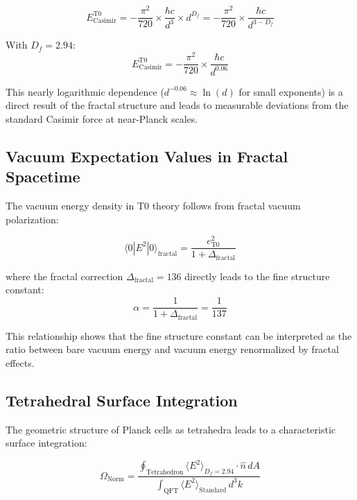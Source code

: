 \documentclass[12pt,a4paper]{article}
\theoremstyle{definition}
\begin{document}
	\begin{equation}
		E_{\text{Casimir}}^{\text{T0}} = -\frac{\pi^2}{720} \times \frac{\hbar c}{d^3} \times d^{D_f} = -\frac{\pi^2}{720} \times \frac{\hbar c}{d^{3-D_f}}
	\end{equation}
	
	With $D_f = 2.94$:
	\begin{equation}
		E_{\text{Casimir}}^{\text{T0}} = -\frac{\pi^2}{720} \times \frac{\hbar c}{d^{0.06}}
	\end{equation}
	
	This nearly logarithmic dependence ($d^{-0.06} \approx \ln(d)$ for small exponents) is a direct result of the fractal structure and leads to measurable deviations from the standard Casimir force at near-Planck scales.
	
	\subsection{Vacuum Expectation Values in Fractal Spacetime}
	
	The vacuum energy density in T0 theory follows from fractal vacuum polarization:
	
	\begin{equation}
		\langle 0|E^2|0 \rangle_{\text{fractal}} = \frac{e_{\text{T0}}^2}{1 + \Delta_{\text{fractal}}}
	\end{equation}
	
	where the fractal correction $\Delta_{\text{fractal}} = 136$ directly leads to the fine structure constant:
	\begin{equation}
		\alpha = \frac{1}{1 + \Delta_{\text{fractal}}} = \frac{1}{137}
	\end{equation}
	
	This relationship shows that the fine structure constant can be interpreted as the ratio between bare vacuum energy and vacuum energy renormalized by fractal effects.
	
	\subsection{Tetrahedral Surface Integration}
	
	The geometric structure of Planck cells as tetrahedra leads to a characteristic surface integration:
	
	\begin{equation}
		\Omega_{\text{Norm}} = \frac{\oint_{\text{Tetrahedron}} \langle E^2 \rangle_{D_f=2.94} \cdot \hat{n} \, dA}{\int_{\text{QFT}} \langle E^2 \rangle_{\text{Standard}} \, d^3k}
	\end{equation}
	
\end{document}
